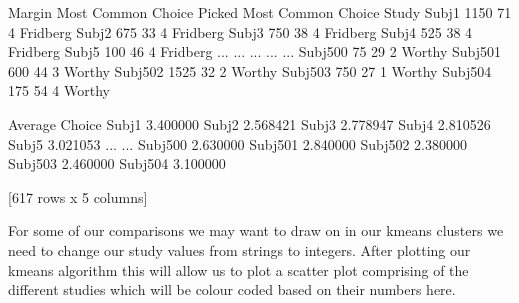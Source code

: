 \documentclass[letterpaper,10pt,english]{jupyterBook}
\begin{document}
\begin{sphinxVerbatim}[commandchars=\\\{\}]
  \PYG{p}{[} \PYG{p}{]}
\PYG{p}{[}\PYG{p}{]}  \PYG{p}{[}\PYG{p}{]}
\end{sphinxVerbatim}

\begin{sphinxVerbatim}[commandchars=\\\{\}]
          Margin  Most Common Choice Picked  Most Common Choice     Study  \PYGZbs{}
Subj\PYGZus{}1      1150                         71                   4  Fridberg   
Subj\PYGZus{}2      \PYGZhy{}675                         33                   4  Fridberg   
Subj\PYGZus{}3      \PYGZhy{}750                         38                   4  Fridberg   
Subj\PYGZus{}4      \PYGZhy{}525                         38                   4  Fridberg   
Subj\PYGZus{}5       100                         46                   4  Fridberg   
...          ...                        ...                 ...       ...   
Subj\PYGZus{}500      75                         29                   2    Worthy   
Subj\PYGZus{}501     600                         44                   3    Worthy   
Subj\PYGZus{}502   \PYGZhy{}1525                         32                   2    Worthy   
Subj\PYGZus{}503    \PYGZhy{}750                         27                   1    Worthy   
Subj\PYGZus{}504     175                         54                   4    Worthy   

          Average Choice  
Subj\PYGZus{}1          3.400000  
Subj\PYGZus{}2          2.568421  
Subj\PYGZus{}3          2.778947  
Subj\PYGZus{}4          2.810526  
Subj\PYGZus{}5          3.021053  
...                  ...  
Subj\PYGZus{}500        2.630000  
Subj\PYGZus{}501        2.840000  
Subj\PYGZus{}502        2.380000  
Subj\PYGZus{}503        2.460000  
Subj\PYGZus{}504        3.100000  

[617 rows x 5 columns]
\end{sphinxVerbatim}

\sphinxAtStartPar
For some of our comparisons we may want to draw on in our k\sphinxhyphen{}means clusters we need to change our study values from strings to integers. After plotting our k\sphinxhyphen{}means algorithm this will allow us to plot a scatter plot comprising of the different studies which will be colour coded based on their numbers here.
\end{document}
